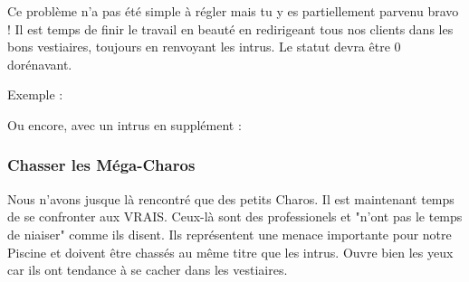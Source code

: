 \documentclass[a4paper, 12pt]{article}
\begin{document}
{    Ce problème n'a pas été simple à régler mais tu y es partiellement parvenu bravo !
    Il est temps de finir le travail en beauté en redirigeant tous nos clients
    dans les bons vestiaires, toujours en renvoyant les intrus.
    \newline \newline
    Le statut devra être 0 dorénavant.
    \newline \newline
    
    Exemple :
    \vspace{1cm}
    
    Ou encore, avec un intrus en supplément :
    
    \vspace{2cm}
    
    \subsubsection{Chasser les Méga-Charos}

    Nous n'avons jusque là rencontré que des petits Charos. Il est maintenant
    temps de se confronter aux VRAIS. Ceux-là sont des professionels
    et "n'ont pas le temps de niaiser" comme ils disent. Ils représentent
    une menace importante pour notre Piscine et doivent être chassés au même titre
    que les intrus.
    \newline \newline
    Ouvre bien les yeux car ils ont tendance à se cacher dans les vestiaires.

}
\end{document}
